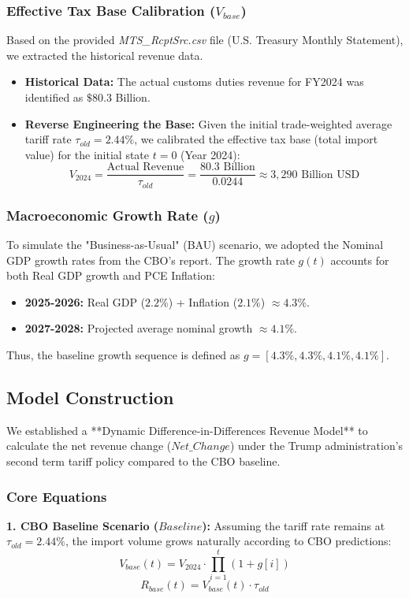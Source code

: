 \documentclass{apmcmthesis}
\begin{document}
\subsubsection{Effective Tax Base Calibration ($V_{base}$)}
Based on the provided \textit{MTS\_RcptSrc.csv} file (U.S. Treasury Monthly Statement), we extracted the historical revenue data.
\begin{itemize}
    \item \textbf{Historical Data:} The actual customs duties revenue for FY2024 was identified as $\$80.3$ Billion.
    \item \textbf{Reverse Engineering the Base:} Given the initial trade-weighted average tariff rate $\tau_{old} = 2.44\%$, we calibrated the effective tax base (total import value) for the initial state $t=0$ (Year 2024):
    \begin{equation}
        V_{2024} = \frac{\text{Actual Revenue}}{\tau_{old}} = \frac{80.3 \text{ Billion}}{0.0244} \approx 3,290 \text{ Billion USD}
    \end{equation}
\end{itemize}

\subsubsection{Macroeconomic Growth Rate ($g$)}
To simulate the "Business-as-Usual" (BAU) scenario, we adopted the Nominal GDP growth rates from the CBO's report. The growth rate $g(t)$ accounts for both Real GDP growth and PCE Inflation:
\begin{itemize}
    \item \textbf{2025-2026:} Real GDP ($2.2\%$) + Inflation ($2.1\%$) $\approx 4.3\%$.
    \item \textbf{2027-2028:} Projected average nominal growth $\approx 4.1\%$.
\end{itemize}
Thus, the baseline growth sequence is defined as $g = [4.3\%, 4.3\%, 4.1\%, 4.1\%]$.

\subsection{Model Construction}
We established a **Dynamic Difference-in-Differences Revenue Model** to calculate the net revenue change ($Net\_Change$) under the Trump administration's second term tariff policy compared to the CBO baseline.

\subsubsection{Core Equations}
\textbf{1. CBO Baseline Scenario ($Baseline$):} Assuming the tariff rate remains at $\tau_{old} = 2.44\%$, the import volume grows naturally according to CBO predictions:
\begin{equation}
    V_{base}(t) = V_{2024} \cdot \prod_{i=1}^{t} (1 + g[i])
\end{equation}
\begin{equation}
    R_{base}(t) = V_{base}(t) \cdot \tau_{old}
\end{equation}
\end{document}

